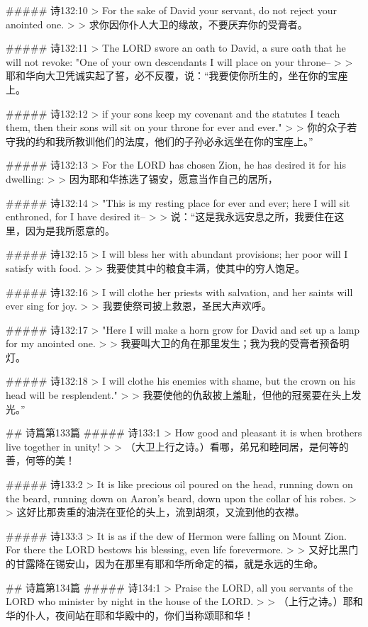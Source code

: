 ##### 诗132:10
> For the sake of David your servant, do not reject your anointed one.
>
> 求你因你仆人大卫的缘故，不要厌弃你的受膏者。


##### 诗132:11
> The LORD swore an oath to David, a sure oath that he will not revoke: "One of your own descendants I will place on your throne--
>
> 耶和华向大卫凭诚实起了誓，必不反覆，说：“我要使你所生的，坐在你的宝座上。


##### 诗132:12
> if your sons keep my covenant and the statutes I teach them, then their sons will sit on your throne for ever and ever."
>
> 你的众子若守我的约和我所教训他们的法度，他们的子孙必永远坐在你的宝座上。”


##### 诗132:13
> For the LORD has chosen Zion, he has desired it for his dwelling:
>
> 因为耶和华拣选了锡安，愿意当作自己的居所，


##### 诗132:14
> "This is my resting place for ever and ever; here I will sit enthroned, for I have desired it--
>
> 说：“这是我永远安息之所，我要住在这里，因为是我所愿意的。


##### 诗132:15
> I will bless her with abundant provisions; her poor will I satisfy with food.
>
> 我要使其中的粮食丰满，使其中的穷人饱足。


##### 诗132:16
> I will clothe her priests with salvation, and her saints will ever sing for joy.
>
> 我要使祭司披上救恩，圣民大声欢呼。


##### 诗132:17
> "Here I will make a horn grow for David and set up a lamp for my anointed one.
>
> 我要叫大卫的角在那里发生；我为我的受膏者预备明灯。


##### 诗132:18
> I will clothe his enemies with shame, but the crown on his head will be resplendent."
>
> 我要使他的仇敌披上羞耻，但他的冠冕要在头上发光。”


## 诗篇第133篇
##### 诗133:1
> How good and pleasant it is when brothers live together in unity!
>
> （大卫上行之诗。）看哪，弟兄和睦同居，是何等的善，何等的美！


##### 诗133:2
> It is like precious oil poured on the head, running down on the beard, running down on Aaron's beard, down upon the collar of his robes.
>
> 这好比那贵重的油浇在亚伦的头上，流到胡须，又流到他的衣襟。


##### 诗133:3
> It is as if the dew of Hermon were falling on Mount Zion. For there the LORD bestows his blessing, even life forevermore.
>
> 又好比黑门的甘露降在锡安山，因为在那里有耶和华所命定的福，就是永远的生命。


## 诗篇第134篇
##### 诗134:1
> Praise the LORD, all you servants of the LORD who minister by night in the house of the LORD.
>
> （上行之诗。）耶和华的仆人，夜间站在耶和华殿中的，你们当称颂耶和华！


